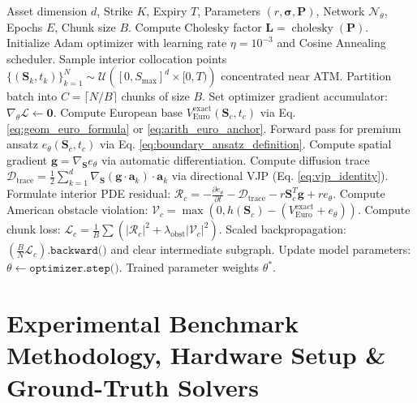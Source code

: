 \documentclass[11pt,a4paper]{article}
\begin{document}
\begin{algorithm}[htbp]
\caption{Deep-EEP-PINN Training with $\mathcal{O}(d)$ Directional Contraction \& Chunking}
\label{alg:deep_eep_pinn}
\begin{algorithmic}[1]
\Require Asset dimension $d$, Strike $K$, Expiry $T$, Parameters $(r, \boldsymbol{\sigma}, \mathbf{P})$, Network $\mathcal{N}_\theta$, Epochs $E$, Chunk size $B$.
\State Compute Cholesky factor $\mathbf{L} = \operatorname{cholesky}(\mathbf{P})$.
\State Initialize Adam optimizer with learning rate $\eta = 10^{-3}$ and Cosine Annealing scheduler.
    \State Sample interior collocation points $\{(\mathbf{S}_k, t_k)\}_{k=1}^N \sim \mathcal{U}\left([0, S_{\max}]^d \times [0, T)\right)$ concentrated near ATM.
    \State Partition batch into $C = \lceil N / B \rceil$ chunks of size $B$.
    \State Set optimizer gradient accumulator: $\nabla_\theta \mathcal{L} \leftarrow \mathbf{0}$.
        \State Compute European base $V_{\text{Euro}}^{\text{exact}}(\mathbf{S}_c, t_c)$ via Eq. \eqref{eq:geom_euro_formula} or \eqref{eq:arith_euro_anchor}.
        \State Forward pass for premium ansatz $e_\theta(\mathbf{S}_c, t_c)$ via Eq. \eqref{eq:boundary_ansatz_definition}.
        \State Compute spatial gradient $\mathbf{g} = \nabla_{\mathbf{S}} e_\theta$ via automatic differentiation.
        \State Compute diffusion trace $\mathcal{D}_{\text{trace}} = \frac{1}{2}\sum_{k=1}^d \nabla_{\mathbf{S}}(\mathbf{g} \cdot \mathbf{a}_k) \cdot \mathbf{a}_k$ via directional VJP (Eq. \eqref{eq:vjp_identity}).
        \State Formulate interior PDE residual: $\mathcal{R}_c = -\frac{\partial e_\theta}{\partial t} - \mathcal{D}_{\text{trace}} - r \mathbf{S}_c^T \mathbf{g} + r e_\theta$.
        \State Compute American obstacle violation: $\mathcal{V}_c = \max\left(0, h(\mathbf{S}_c) - (V_{\text{Euro}}^{\text{exact}} + e_\theta)\right)$.
        \State Compute chunk loss: $\mathcal{L}_c = \frac{1}{B}\sum \left( |\mathcal{R}_c|^2 + \lambda_{\text{obst}} |\mathcal{V}_c|^2 \right)$.
        \State Scaled backpropagation: $\left(\frac{B}{N} \mathcal{L}_c\right).\texttt{backward()}$ and clear intermediate subgraph.
    \EndFor
    \State Update model parameters: $\theta \leftarrow \texttt{optimizer.step()}$.
\EndFor
\State \Return Trained parameter weights $\theta^*$.
\end{algorithmic}
\end{algorithm}

\section{Experimental Benchmark Methodology, Hardware Setup \& Ground-Truth Solvers}
\end{document}
